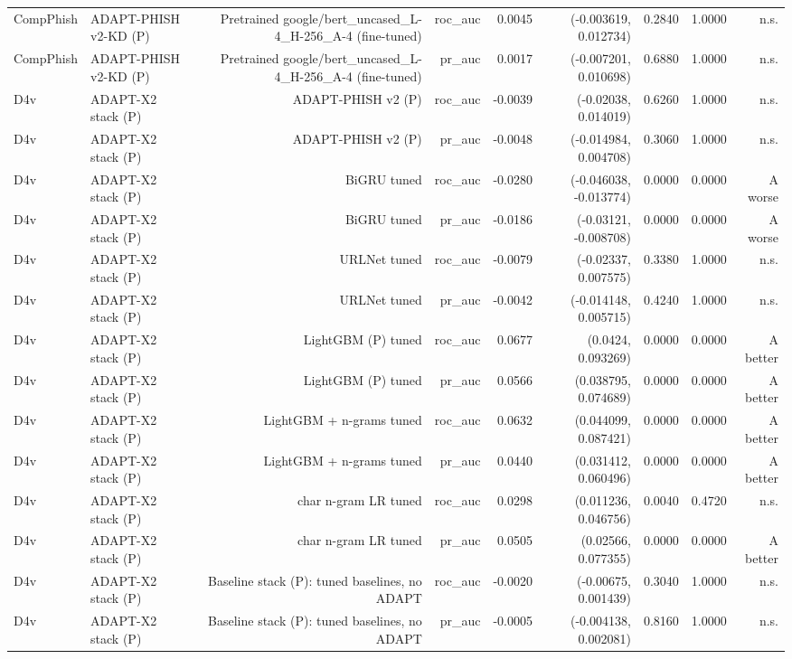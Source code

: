 \begin{table}[t]
\begin{tabular}{llrrrrrrr}
CompPhish & ADAPT-PHISH v2-KD (P) & Pretrained google/bert\_uncased\_L-4\_H-256\_A-4 (fine-tuned) & roc\_auc & 0.0045 & (-0.003619, 0.012734) & 0.2840 & 1.0000 & n.s. \\
CompPhish & ADAPT-PHISH v2-KD (P) & Pretrained google/bert\_uncased\_L-4\_H-256\_A-4 (fine-tuned) & pr\_auc & 0.0017 & (-0.007201, 0.010698) & 0.6880 & 1.0000 & n.s. \\
D4v & ADAPT-X2 stack (P) & ADAPT-PHISH v2 (P) & roc\_auc & -0.0039 & (-0.02038, 0.014019) & 0.6260 & 1.0000 & n.s. \\
D4v & ADAPT-X2 stack (P) & ADAPT-PHISH v2 (P) & pr\_auc & -0.0048 & (-0.014984, 0.004708) & 0.3060 & 1.0000 & n.s. \\
D4v & ADAPT-X2 stack (P) & BiGRU tuned & roc\_auc & -0.0280 & (-0.046038, -0.013774) & 0.0000 & 0.0000 & A worse \\
D4v & ADAPT-X2 stack (P) & BiGRU tuned & pr\_auc & -0.0186 & (-0.03121, -0.008708) & 0.0000 & 0.0000 & A worse \\
D4v & ADAPT-X2 stack (P) & URLNet tuned & roc\_auc & -0.0079 & (-0.02337, 0.007575) & 0.3380 & 1.0000 & n.s. \\
D4v & ADAPT-X2 stack (P) & URLNet tuned & pr\_auc & -0.0042 & (-0.014148, 0.005715) & 0.4240 & 1.0000 & n.s. \\
D4v & ADAPT-X2 stack (P) & LightGBM (P) tuned & roc\_auc & 0.0677 & (0.0424, 0.093269) & 0.0000 & 0.0000 & A better \\
D4v & ADAPT-X2 stack (P) & LightGBM (P) tuned & pr\_auc & 0.0566 & (0.038795, 0.074689) & 0.0000 & 0.0000 & A better \\
D4v & ADAPT-X2 stack (P) & LightGBM + n-grams tuned & roc\_auc & 0.0632 & (0.044099, 0.087421) & 0.0000 & 0.0000 & A better \\
D4v & ADAPT-X2 stack (P) & LightGBM + n-grams tuned & pr\_auc & 0.0440 & (0.031412, 0.060496) & 0.0000 & 0.0000 & A better \\
D4v & ADAPT-X2 stack (P) & char n-gram LR tuned & roc\_auc & 0.0298 & (0.011236, 0.046756) & 0.0040 & 0.4720 & n.s. \\
D4v & ADAPT-X2 stack (P) & char n-gram LR tuned & pr\_auc & 0.0505 & (0.02566, 0.077355) & 0.0000 & 0.0000 & A better \\
D4v & ADAPT-X2 stack (P) & Baseline stack (P): tuned baselines, no ADAPT & roc\_auc & -0.0020 & (-0.00675, 0.001439) & 0.3040 & 1.0000 & n.s. \\
D4v & ADAPT-X2 stack (P) & Baseline stack (P): tuned baselines, no ADAPT & pr\_auc & -0.0005 & (-0.004138, 0.002081) & 0.8160 & 1.0000 & n.s. \\

\end{tabular}
\end{table}
